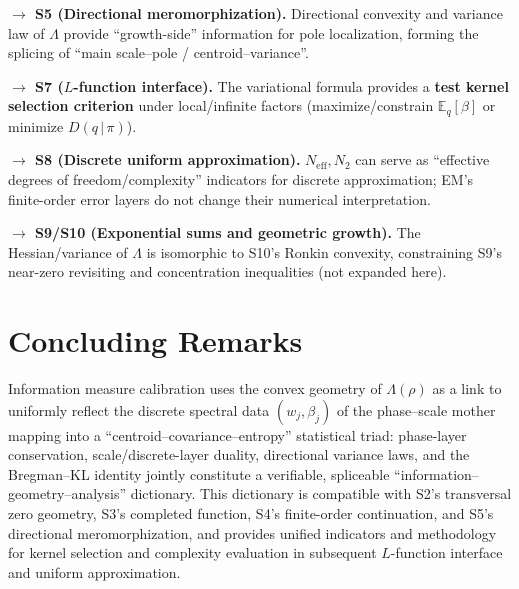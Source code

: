 \documentclass[11pt,a4paper]{article}
\theoremstyle{remark}
\begin{document}
\textbf{$\to$ S5 (Directional meromorphization).} Directional convexity and variance law of $\Lambda$ provide ``growth-side'' information for pole localization, forming the splicing of ``main scale--pole / centroid--variance''.

\textbf{$\to$ S7 ($L$-function interface).} The variational formula provides a \textbf{test kernel selection criterion} under local/infinite factors (maximize/constrain $\mathbb{E}_q[\beta]$ or minimize $D(q\,|\,\pi)$).

\textbf{$\to$ S8 (Discrete uniform approximation).} $N_{\mathrm{eff}},N_2$ can serve as ``effective degrees of freedom/complexity'' indicators for discrete approximation; EM's finite-order error layers do not change their numerical interpretation.

\textbf{$\to$ S9/S10 (Exponential sums and geometric growth).} The Hessian/variance of $\Lambda$ is isomorphic to S10's Ronkin convexity, constraining S9's near-zero revisiting and concentration inequalities (not expanded here).

\section*{Concluding Remarks}

Information measure calibration uses the convex geometry of $\Lambda(\rho)$ as a link to uniformly reflect the discrete spectral data $(w_j,\beta_j)$ of the phase--scale mother mapping into a ``centroid--covariance--entropy'' statistical triad: phase-layer conservation, scale/discrete-layer duality, directional variance laws, and the Bregman--KL identity jointly constitute a verifiable, spliceable ``information--geometry--analysis'' dictionary. This dictionary is compatible with S2's transversal zero geometry, S3's completed function, S4's finite-order continuation, and S5's directional meromorphization, and provides unified indicators and methodology for kernel selection and complexity evaluation in subsequent $L$-function interface and uniform approximation.
\end{document}
